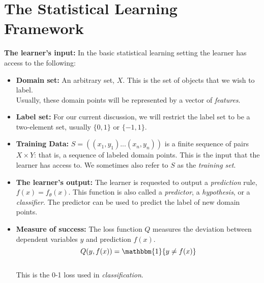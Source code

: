 \documentclass{article}
\begin{document}
\section{The Statistical Learning Framework}

\textbf{The learner's input:} In the basic statistical learning setting the learner has access to the following:
\begin{itemize}
    \item \textbf{Domain set:} An arbitrary set, $X$. This is the set of objects that we wish to label.
    \\Usually, these domain points will be represented by a vector of \textit{features}.
    \item \textbf{Label set:} For our current discussion, we will restrict the label set to be a two-element set, usually $\{0,1\}$ or $\{-1,1\}$.
    \item \textbf{Training Data:} $S = ((x_1,y_1)...(x_n,y_n))$ is a finite sequence of pairs $X \times Y$: that is, a sequence of labeled domain points. This is the input that the learner has access to. We sometimes also refer to $S$ as the \textit{training set}.
    \item \textbf{The learner's output:} The learner is requested to output a \textit{prediction} rule, $f(x) = f_\theta (x)$. This function is also called a \textit{predictor}, a \textit{hypothesis}, or a \textit{classifier}. The predictor can be used to predict the label of new domain points.
    \item \textbf{Measure of success: } The loss function $Q$ measures the deviation between dependent variables $y$ and prediction $f(x)$.
    \begin{equation*}
        Q(y, f(x)) = \mathbbm{1}{y\neq f(x)}
    \end{equation*}
    \\This is the 0-1 loss used in \textit{classification}.
\end{itemize}
\end{document}
